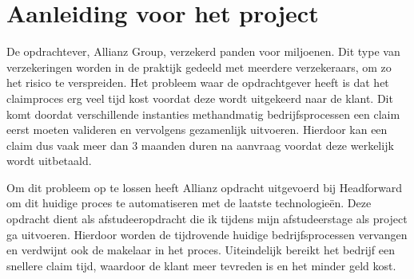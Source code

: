 \chapter{Aanleiding voor het project}
De opdrachtever, Allianz Group, verzekerd panden voor miljoenen. Dit type van verzekeringen worden in de praktijk gedeeld met meerdere verzekeraars, om zo het risico te verspreiden. Het probleem waar de opdrachtgever heeft is dat het claimproces erg veel tijd kost voordat deze wordt uitgekeerd naar de klant. Dit komt doordat verschillende instanties methandmatig bedrijfsprocessen een claim eerst moeten valideren en vervolgens gezamenlijk uitvoeren. Hierdoor kan een claim dus vaak meer dan 3 maanden duren na aanvraag voordat deze werkelijk wordt uitbetaald.

Om dit probleem op te lossen heeft Allianz opdracht uitgevoerd bij Headforward om dit huidige proces te automatiseren met de laatste technologieën. Deze opdracht dient als afstudeeropdracht die ik tijdens mijn afstudeerstage als project ga uitvoeren. Hierdoor worden de tijdrovende huidige bedrijfsprocessen vervangen en verdwijnt ook de makelaar in het proces. Uiteindelijk bereikt het bedrijf een snellere claim tijd, waardoor de klant meer tevreden is en het minder geld kost.